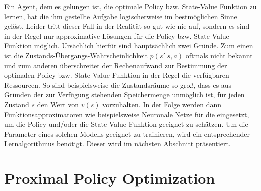 Ein Agent, dem es gelungen ist, die optimale Policy bzw. State-Value Funktion zu lernen, hat die ihm gestellte Aufgabe logischerweise im bestmöglichen Sinne gelöst. Leider tritt dieser Fall in der Realität so gut wie nie auf, sondern es sind in der Regel nur approximative Lösungen für die Policy bzw. State-Value Funktion möglich. Ursächlich hierfür sind hauptsächlich zwei Gründe. Zum einen ist die Zustands-Übergangs-Wahrscheinlichkeit $p(s'|s,a)$ oftmals nicht bekannt und zum anderen überschreitet der Rechenaufwand zur Bestimmung der optimalen Policy bzw. State-Value Funktion in der Regel die verfügbaren Ressourcen. So sind beispielsweise die Zustandsräume so groß, dass es aus Gründen der zur Verfügung stehenden Speichermenge unmöglich ist, für jeden Zustand $s$ den Wert von $v(s)$ vorzuhalten. In der Folge werden dann Funktionsapproximatoren wie beispielsweise Neuronale Netze für die eingesetzt, um die Policy und/oder die State-Value Funktion geeignet zu schätzen. Um die Parameter eines solchen Modells geeignet zu trainieren, wird ein entsprechender Lernalgorithmus benötigt. Dieser wird im nächsten Abschnitt präsentiert.


\section{Proximal Policy Optimization}
\label{sec_ppo}

